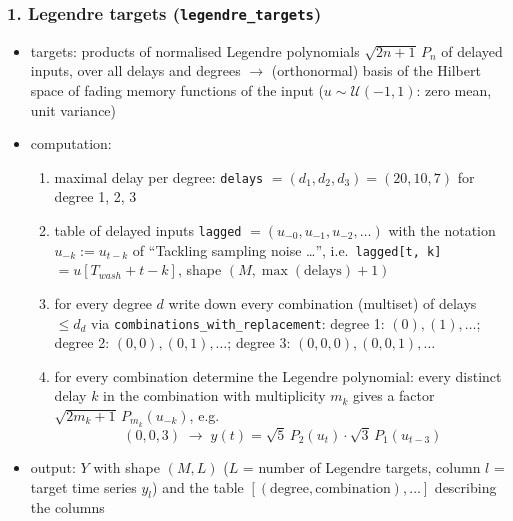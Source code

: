 \subsubsection*{1. Legendre targets (\texttt{legendre\_targets})}
\begin{itemize}
    \item targets: products of normalised Legendre polynomials $\sqrt{2n+1}\,P_n$ of delayed inputs, over all
    delays and degrees $\to$ (orthonormal) basis of the Hilbert space of fading memory functions of the input
    ($u \sim \mathcal{U}(-1,1)$: zero mean, unit variance)
    \item computation:
    \begin{enumerate}
        \item maximal delay per degree: \texttt{delays} $= (d_1, d_2, d_3) = (20, 10, 7)$ for degree 1, 2, 3
        \item table of delayed inputs \texttt{lagged} $= (u_{-0}, u_{-1}, u_{-2}, \ldots)$ with the notation
        $u_{-k} := u_{t-k}$ of ``Tackling sampling noise \ldots'', i.e.\
        \texttt{lagged[t, k]} $= u[T_{wash} + t - k]$, shape $(M, \max(\text{delays}) + 1)$
        \item for every degree $d$ write down every combination (multiset) of delays $\le d_d$ via
        \texttt{combinations\_with\_replacement}: degree 1: $(0), (1), \ldots$; degree 2: $(0,0), (0,1), \ldots$;
        degree 3: $(0,0,0), (0,0,1), \ldots$
        \item for every combination determine the Legendre polynomial: every distinct delay $k$ in the
        combination with multiplicity $m_k$ gives a factor $\sqrt{2m_k+1}\,P_{m_k}(u_{-k})$, e.g.\
        \begin{equation*}
            (0, 0, 3) \;\to\; y(t) = \sqrt{5}\,P_2(u_{t})\cdot\sqrt{3}\,P_1(u_{t-3})
        \end{equation*}
    \end{enumerate}
    \item output: $Y$ with shape $(M, L)$ ($L$ = number of Legendre targets, column $l$ = target time series
    $y_l$) and the table $[(\text{degree}, \text{combination}), \ldots]$ describing the columns
\end{itemize}

